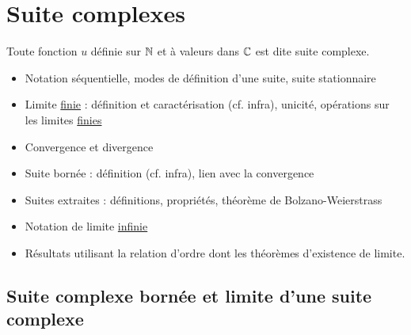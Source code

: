 \section{Suite complexes}
\begin{defi}
    Toute fonction \(u\) définie sur \(\mathbb{N}\) et à valeurs dans \(\mathbb{C}\) est dite suite complexe.
\end{defi}

\begin{defprop}
    \begin{itemize}
        \item Notation séquentielle, modes de définition d’une suite, suite stationnaire
        \item Limite \underline{finie} : définition et caractérisation (cf. infra), unicité, opérations sur les limites \underline{finies}
        \item Convergence et divergence
        \item Suite bornée : définition (cf. infra), lien avec la convergence
        \item Suites extraites : définitions, propriétés, théorème de Bolzano-Weierstrass
    \end{itemize}
\end{defprop}

\begin{defprop}
    \begin{itemize}
        \item Notation de limite \underline{infinie}
        \item Résultats utilisant la relation d’ordre dont les théorèmes d’existence de limite.
    \end{itemize}
\end{defprop}

\subsection{Suite complexe bornée et limite d’une suite complexe}

